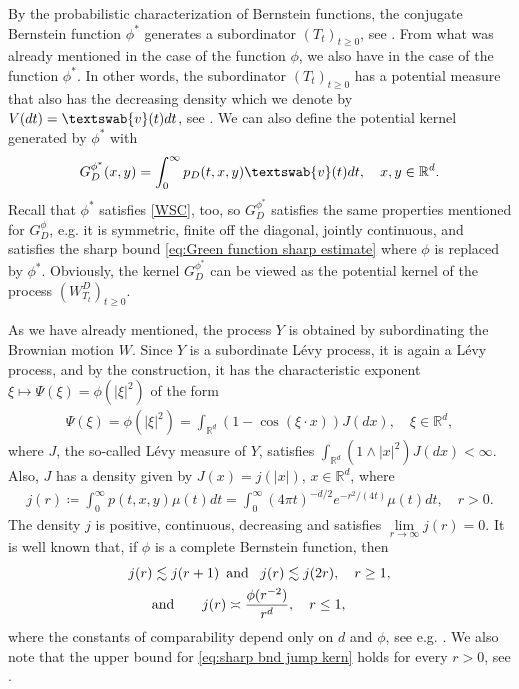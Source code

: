 \documentclass[12pt,a4paper,onecolumn]{amsart}
\theoremstyle{definition}
\newcommand{\R}{\mathbb{R}}
\newcommand{\1}{\mathbf 1}
\newcommand{\GDfi}{G^\phi_{ D}}
\newcommand{\GDFI}{\GDfi}
\newcommand{\GDfz}{G^{\phi^*}_{ D}}
\newcommand{\vv}{\textswab{v}}
\numberwithin{equation}{section}
\begin{document}
By the probabilistic characterization of Bernstein functions, the conjugate Bernstein function $\phi^*$ generates a subordinator $(T_t)_{t\ge0}$, see \cite[Chapter 5]{bernstein}. From what was already mentioned in the case of the function $\phi$, we also have in the case of the function $\phi^*$. In other words, the subordinator $(T_t)_{t\ge0}$ has a potential measure that also has the decreasing density which we denote by $V(dt)=\vv(t)dt$, see \cite[Theorem 11.3 \& Corollary 11.8]{bernstein}. We can also define the potential kernel generated by $\phi^*$ with
\begin{align}\label{eq:defn Green function 2}
	\GDfz(x,y)=\int_0^\infty p_D(t,x,y)\vv(t)dt,\quad x,y\in\R^d.
\end{align}
Recall that $\phi^*$ satisfies \ref{WSC}, too, so $\GDfz$ satisfies the same properties mentioned for $\GDFI$, e.g. it is symmetric, finite off the diagonal, jointly continuous, and satisfies the sharp bound \eqref{eq:Green function sharp estimate} where $\phi$ is replaced by $\phi^*$. Obviously, the kernel $\GDfz$ can be viewed as the potential kernel of the process $(W_{T_t}^D)_{t\ge 0}$.

As we have already mentioned, the process $Y$ is obtained by subordinating the Brownian motion $W$. Since $Y$ is a subordinate L\'evy process, it is again a L\'evy process, and by the construction, it has the characteristic exponent $\xi\mapsto \Psi(\xi)=\phi(|\xi|^2)$ of the form
\begin{align*}
		\Psi(\xi)=\phi(|\xi|^2)=\int_{\R^d}\left(1-\cos(\xi\cdot x)\right) J(dx),\quad \xi\in\R^d,
\end{align*}
where $J$, the so-called L\'evy measure of $Y$, satisfies $\int_{\R^d} (1\wedge |x|^2)J(dx)<\infty$. Also, $J$ has a density given by $J(x)=j(|x|)$, $x\in\R^d$, where
	\begin{align*}
		j(r)\coloneqq \int_0^\infty p(t,x,y)\mu(t)dt=\int_0^\infty (4\pi t)^{-d/2} e^{-r^2/(4t)}\mu(t)dt,\quad r>0.
	\end{align*}
The density $j$ is positive, continuous, decreasing and satisfies $\lim\limits_{r\to\infty}j(r)=0.$
It is well known that, if $\phi$ is a complete Bernstein function, then
\begin{align}
	j(r)\lesssim j(r+1)\enskip&\text{and }\enskip j(r)\lesssim j(2r), \quad r\ge 1,\label{eq:slow decr jump kern}\\
    \text{and}\hspace{2em} j(r)&\asymp \frac{\phi(r^{-2})}{r^d},\quad r\le1,\label{eq:sharp bnd jump kern}
\end{align}
where the constants of comparability depend only on $d$ and $\phi$, see e.g. \cite[Theorem 2.3, Eq. (2.11) \& Eq. (2.12)]{KSV_2012_SCM}. We also note that the upper bound for \eqref{eq:sharp bnd jump kern} holds for every $r>0$, see \cite[Eq. (15)]{bogdan_density_and_tails_unimodal}.
\end{document}
